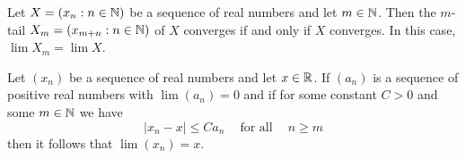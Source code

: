 \begin{theorem}
	Let $X=(x_n:n \in \mathbb{N})$ be a sequence of real numbers and let $m \in \mathbb{N}$. Then the $m$-tail $X_m=(x_{m+n}:n \in \mathbb{N})$ of $X$ converges if and only if $X$ converges. In this case, $\lim X_m = \lim X$.
\end{theorem}

\begin{theorem}
	Let $(x_n)$ be a sequence of real numbers and let $x \in \mathbb{R}$. If $(a_n)$ is a sequence of positive real numbers with $\lim (a_n)=0$ and if for some constant $C >0$ and some $m \in \mathbb{N}$ we have
	\[|x_n - x| \leq Ca_n\ \ \ \ \text{ for all }\ \ \ \ n \geq m\]
	then it follows that $\lim (x_n) = x$.
\end{theorem}

